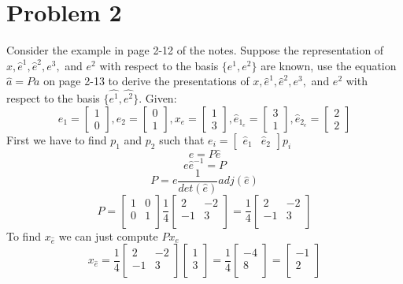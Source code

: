 \documentclass{article}
\begin{document}
\section*{Problem 2}
Consider the example in page 2-12 of the notes.
Suppose the representation of $x, \hat{e}^1, \hat{e}^2, e^3,$ and $e^2$
with respect to the basis $\{e^1,e^2\}$ are  known, use the equation $\hat{a} = Pa$ on page 2-13 to derive the presentations of
$x, \hat{e}^1, \hat{e}^2, e^3,$ and $e^2$
with respect to the basis $\{\hat{e^1},\hat{e^2}\}$.
\newline
\newline
Given:
$$
e_1 = \begin{bmatrix} 1 \\ 0 \end{bmatrix},
e_2 = \begin{bmatrix} 0 \\ 1 \end{bmatrix},
x_{e} = \begin{bmatrix} 1 \\ 3 \end{bmatrix},
\hat{e}_{1_e} = \begin{bmatrix} 3 \\ 1 \end{bmatrix},
\hat{e}_{2_e} = \begin{bmatrix} 2 \\ 2 \end{bmatrix}
$$
First we have to find $p_1$ and $p_2$ such that $e_i = \begin{bmatrix} \hat{e}_1 & \hat{e}_2\end{bmatrix} p_i$
$$ e = P\hat{e} $$
$$ e\hat{e}^{-1} = P $$
$$ P = e\frac{1}{det(\hat{e})}adj(\hat{e})$$
$$ P =
\begin{bmatrix}
1 & 0 \\
0 & 1 \\
\end{bmatrix}
\frac{1}{4}
\begin{bmatrix}
 2 & -2 \\
-1 &  3 \\
\end{bmatrix}
=
\frac{1}{4}
\begin{bmatrix}
 2 & -2 \\
-1 &  3 \\
\end{bmatrix}
$$
To find $x_{\hat{e}}$ we can just compute $Px_e$
$$ x_{\hat{e}} =
\frac{1}{4}
\begin{bmatrix}
 2 & -2 \\
-1 &  3 \\
\end{bmatrix}
\begin{bmatrix}
1 \\
3 \\
\end{bmatrix}
=
\frac{1}{4}
\begin{bmatrix}
-4 \\
8 \\
\end{bmatrix}
=
\begin{bmatrix}
-1 \\
 2 \\
\end{bmatrix}
$$
\end{document}
